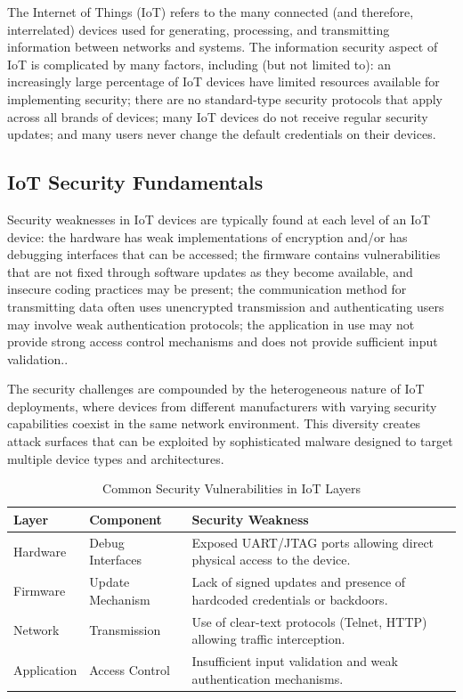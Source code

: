 \documentclass[12pt,letterpaper]{report}
\begin{document}
The Internet of Things (IoT) refers to the many connected (and therefore, interrelated) devices used for generating, processing, and transmitting information between networks and systems. The information security aspect of IoT is complicated by many factors, including (but not limited to): an increasingly large percentage of IoT devices have limited resources available for implementing security; there are no standard-type security protocols that apply across all brands of devices; many IoT devices do not receive regular security updates; and many users never change the default credentials on their devices.

\subsection{IoT Security Fundamentals}

Security weaknesses in IoT devices are typically found at each level of an IoT device: the hardware has weak implementations of encryption and/or has debugging interfaces that can be accessed; the firmware contains vulnerabilities that are not fixed through software updates as they become available, and insecure coding practices may be present; the communication method for transmitting data often uses unencrypted transmission and authenticating users may involve weak authentication protocols; the application in use may not provide strong access control mechanisms and does not provide sufficient input validation.\cite{mahmoud2015iot, pa2015internet}.

The security challenges are compounded by the heterogeneous nature of IoT deployments, where devices from different manufacturers with varying security capabilities coexist in the same network environment. This diversity creates attack surfaces that can be exploited by sophisticated malware designed to target multiple device types and architectures.

\begin{table}[htbp]
    \centering
    \caption{Common Security Vulnerabilities in IoT Layers}
    \label{tab:iot_vulns}
    \begin{tabular}{@{}llp{8cm}@{}}
        {Layer} & \textbf{Component} & \textbf{Security Weakness} \\
        \midrule
        Hardware & Debug Interfaces & Exposed UART/JTAG ports allowing direct physical access to the device\cite{mahmoud2015iot}. \\
        Firmware & Update Mechanism & Lack of signed updates and presence of hardcoded credentials or backdoors\cite{pa2015internet}. \\
        Network & Transmission & Use of clear-text protocols (Telnet, HTTP) allowing traffic interception\cite{silva2013botnets}. \\
        Application & Access Control & Insufficient input validation and weak authentication mechanisms. \\
        \bottomrule
    \end{tabular}
\end{table}
\end{document}
